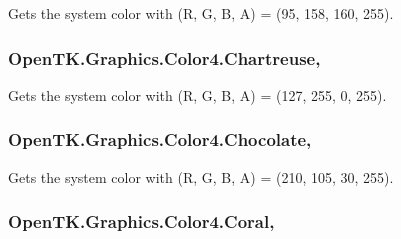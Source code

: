 Gets the system color with (R, G, B, A) = (95, 158, 160, 255). 

\hypertarget{struct_open_t_k_1_1_graphics_1_1_color4_ab76f4b6bd15a9328cbedcf0360746db9}{
\subsubsection[{Chartreuse}]{ Open\-T\-K.\-Graphics.\-Color4.\-Chartreuse\hspace{0.3cm}{\ttfamily [static]}, {\ttfamily [get]}}}\label{struct_open_t_k_1_1_graphics_1_1_color4_ab76f4b6bd15a9328cbedcf0360746db9}


Gets the system color with (R, G, B, A) = (127, 255, 0, 255). 

\hypertarget{struct_open_t_k_1_1_graphics_1_1_color4_aabddfbef7fe16697458868539d7853c2}{
\subsubsection[{Chocolate}]{ Open\-T\-K.\-Graphics.\-Color4.\-Chocolate\hspace{0.3cm}{\ttfamily [static]}, {\ttfamily [get]}}}\label{struct_open_t_k_1_1_graphics_1_1_color4_aabddfbef7fe16697458868539d7853c2}


Gets the system color with (R, G, B, A) = (210, 105, 30, 255). 

\hypertarget{struct_open_t_k_1_1_graphics_1_1_color4_abdefbbeb00a3e635c5e74646d3253e83}{
\subsubsection[{Coral}]{ Open\-T\-K.\-Graphics.\-Color4.\-Coral\hspace{0.3cm}{\ttfamily [static]}, {\ttfamily [get]}}}\label{struct_open_t_k_1_1_graphics_1_1_color4_abdefbbeb00a3e635c5e74646d3253e83}


